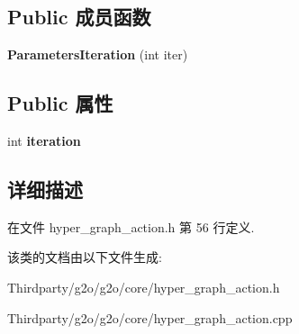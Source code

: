 \subsection*{Public 成员函数}
\begin{DoxyCompactItemize}
\item 
\hypertarget{classg2o_1_1HyperGraphAction_1_1ParametersIteration_ae6849a5bec7eac20ba0f2b0892212694}{{\bfseries Parameters\-Iteration} (int iter)}\label{classg2o_1_1HyperGraphAction_1_1ParametersIteration_ae6849a5bec7eac20ba0f2b0892212694}

\end{DoxyCompactItemize}
\subsection*{Public 属性}
\begin{DoxyCompactItemize}
\item 
\hypertarget{classg2o_1_1HyperGraphAction_1_1ParametersIteration_a6ec1e8c9333e75e9531bebe055e23ce2}{int {\bfseries iteration}}\label{classg2o_1_1HyperGraphAction_1_1ParametersIteration_a6ec1e8c9333e75e9531bebe055e23ce2}

\end{DoxyCompactItemize}


\subsection{详细描述}


在文件 hyper\-\_\-graph\-\_\-action.\-h 第 56 行定义.



该类的文档由以下文件生成\-:\begin{DoxyCompactItemize}
\item 
Thirdparty/g2o/g2o/core/hyper\-\_\-graph\-\_\-action.\-h\item 
Thirdparty/g2o/g2o/core/hyper\-\_\-graph\-\_\-action.\-cpp\end{DoxyCompactItemize}
